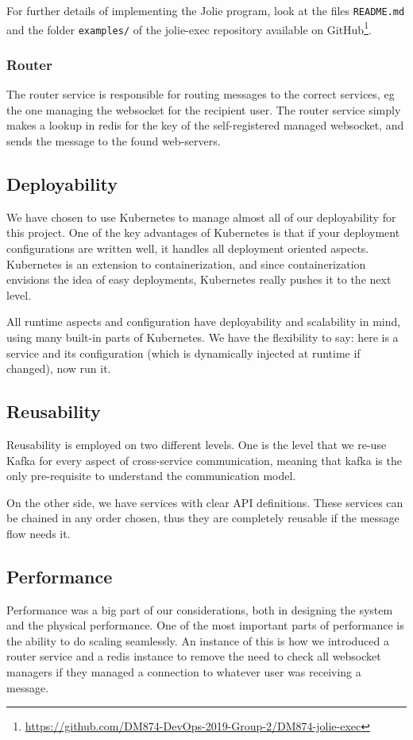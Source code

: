 For further details of implementing the Jolie program, look at the files \texttt{README.md} and the folder \texttt{examples/} of the jolie-exec repository available on GitHub\footnote{\url{https://github.com/DM874-DevOps-2019-Group-2/DM874-jolie-exec}}.

\subsubsection{Router}
The router service is responsible for routing messages to the correct services, eg the one managing the websocket for the recipient user.
The router service simply makes a lookup in redis for the key of the self-registered managed websocket, and sends the message to the found web-servers.
\subsection{Deployability}
We have chosen to use Kubernetes to manage almost all of our deployability for this project.
One of the key advantages of Kubernetes is that if your deployment configurations are written well, it handles all deployment oriented aspects.
Kubernetes is an extension to containerization, and since containerization envisions the idea of easy deployments, Kubernetes really pushes it to the next level.

All runtime aspects and configuration have deployability and scalability in mind, using many built-in parts of Kubernetes.
We have the flexibility to say: here is a service and its configuration (which is dynamically injected at runtime if changed), now run it.

\subsection{Reusability}
Reusability is employed on two different levels.
One is the level that we re-use Kafka for every aspect of cross-service communication, meaning that kafka is the only pre-requisite to understand the communication model.

On the other side, we have services with clear API definitions.
These services can be chained in any order chosen, thus they are completely reusable if the message flow needs it.
\subsection{Performance}
Performance was a big part of our considerations, both in designing the system and the physical performance.
One of the most important parts of performance is the ability to do scaling seamlessly.
An instance of this is how we introduced a router service and a redis instance to remove the need to check all websocket managers if they managed a connection to whatever user was receiving a message.

